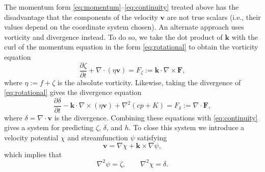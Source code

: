 \documentclass[12pt]{article}
\newcommand{\vecv}{\mathbf{v}}
\newcommand{\veck}{\mathbf{k}}
\newcommand{\Fmom}{\mathbf{F}}
\newcommand{\Fzeta}{F_{\zeta}}
\newcommand{\Fdelta}{F_{\delta}}
\newcommand{\p}{{p}}   %
\newcommand{\cross}{\times}
\newcommand{\del}{\nabla}
\begin{document}
The momentum form \eqref{eq:momentum}--\eqref{eq:continuity} treated above has
the disadvantage that the components of the velocity $\vecv$ are not true
scalars (i.e., their values depend on the coordinate system chosen).  An
alternate approach uses vorticity and divergence instead.  To do so, we take
the dot product of $\veck$ with the curl of the momentum equation in the form
\eqref{eq:rotational} to obtain the vorticity equation 
\begin{equation}
   \frac{\partial \zeta}{\partial t} + \del\cdot(\eta\vecv) =
      \Fzeta := \veck\cdot\del\cross\Fmom ,
\label{eq:vorticity}
\end{equation}
where $\eta:=f+\zeta$ is the absolute vorticity.  Likewise, taking the
divergence of \eqref{eq:rotational} gives the divergence equation
\begin{equation}
   \frac{\partial \delta}{\partial t} - \veck\cdot\del\cross(\eta\vecv) 
      + \del^2 \left(c\p + K\right) = \Fdelta := \del\cdot\Fmom ,
\label{eq:divergence}
\end{equation}
where $\delta = \del\cdot\vecv$ is the divergence.  Combining these equations
with \eqref{eq:continuity} gives a system for predicting $\zeta$, $\delta$,
and $h$.  To close this system we introduce a velocity potential $\chi$ and
streamfunction $\psi$ satisfying 
\begin{equation}
   \vecv = \del\chi + \veck\cross\del\psi ,
\label{eq:wind}
\end{equation}
which implies that
\begin{equation}
   \del^2\psi = \zeta, \qquad \del^2\chi = \delta .
\label{eq:Poisson}
\end{equation}
\end{document}
